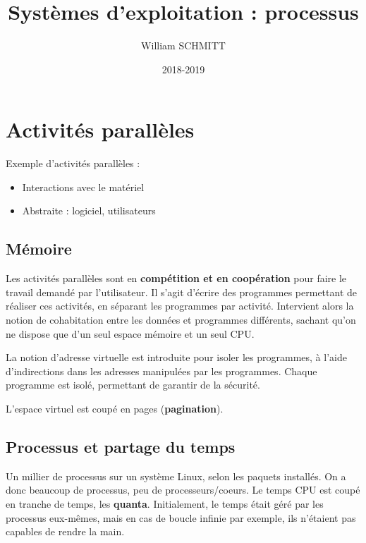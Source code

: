 \documentclass[11pt]{article}
\title{Systèmes d'exploitation : processus}
\author{William SCHMITT}
\date{2018-2019}
\begin{document}
\maketitle

\section{Activités parallèles}
Exemple d'activités parallèles :
\begin{itemize}
    \item Interactions avec le matériel
    \item Abstraite : logiciel, utilisateurs
\end{itemize}

\subsection{Mémoire}

Les activités parallèles sont en \textbf{compétition et en coopération} pour faire le travail demandé par l'utilisateur. Il s'agit d'écrire des programmes permettant de réaliser ces activités, en séparant les programmes par activité.
Intervient alors la notion de cohabitation entre les données et programmes différents, sachant qu'on ne dispose que d'un seul espace mémoire et un seul CPU.

La notion d'adresse virtuelle est introduite pour isoler les programmes, à l'aide d'indirections dans les adresses manipulées par les programmes. Chaque programme est isolé, permettant de garantir de la sécurité.

L'espace virtuel est coupé en pages (\textbf{pagination}).


\subsection{Processus et partage du temps}
Un millier de processus sur un système Linux, selon les paquets installés. On a donc beaucoup de processus, peu de processeurs/coeurs.
Le temps CPU est coupé en tranche de temps, les \textbf{quanta}. Initialement, le temps était géré par les processus eux-mêmes, mais en cas de boucle infinie par exemple, ils n'étaient pas capables de rendre la main.
\end{document}
